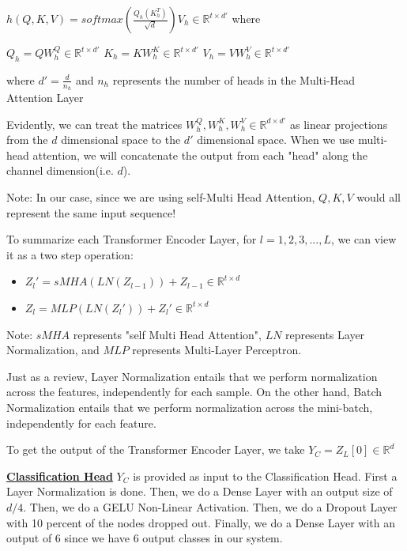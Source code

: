 \documentclass[conference]{IEEEtran}
\begin{document}
$h(Q, K, V) = softmax(\frac{Q_h (K_h^T)}{\sqrt{d}}) V_h \in \mathbb{R}^{t \times d'}$ where \newline

$Q_h = QW_h^Q \in \mathbb{R}^{t \times d'}$ \newline 
$K_h = KW_h^K \in \mathbb{R}^{t \times d'}$ \newline 
$V_h = VW_h^V \in \mathbb{R}^{t \times d'}$ \newline 

where $d' = \frac{d}{n_h}$ and $n_h$ represents the number of heads in the Multi-Head Attention Layer \newline 

Evidently, we can treat the matrices $W_h^Q, W_h^K, W_h^V \in \mathbb{R}^{d \times d'}$ as linear projections from the $d$ dimensional space to the $d'$ dimensional space. When we use multi-head attention, we will concatenate the output from each "head" along the channel dimension(i.e. $d$). \newline 

Note: In our case, since we are using self-Multi Head Attention, $Q, K, V$ would all represent the same input sequence! \newline 

To summarize each Transformer Encoder Layer, for $l = 1, 2, 3, ..., L$, we can view it as a two step operation: 
\begin{itemize}
    \item $Z_l ' = sMHA(LN(Z_{l-1})) + Z_{l - 1} \in \mathbb{R}^{t \times d}$
    \item $Z_l = MLP(LN(Z_{l} ')) + Z_{l} ' \in \mathbb{R}^{t \times d}$
\end{itemize}

Note: $sMHA$ represents "self Multi Head Attention", $LN$ represents Layer Normalization, and $MLP$ represents Multi-Layer Perceptron. \newline 

Just as a review, Layer Normalization entails that we perform normalization across the features, independently for each sample. On the other hand, Batch Normalization entails that we perform normalization across the mini-batch, independently for each feature. \newline 


To get the output of the Transformer Encoder Layer, we take $Y_C = Z_L[0] \in \mathbb{R}^d$ \newline

\textbf{\underline{Classification Head}} \newline 
$Y_C$ is provided as input to the Classification Head. First a Layer Normalization is done. Then, we do a Dense Layer with an output size of $d/4$. Then, we do a GELU Non-Linear Activation. Then, we do a Dropout Layer with 10 percent of the nodes dropped out. Finally, we do a Dense Layer with an output of 6 since we have 6 output classes in our system. 
\end{document}
